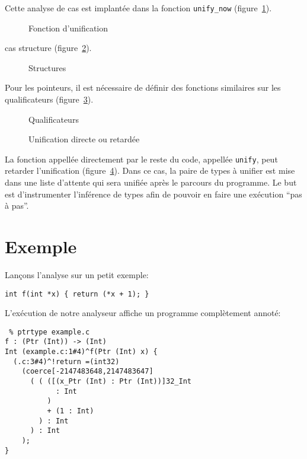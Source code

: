 Cette analyse de cas est implantée dans la fonction \texttt{unify_now}
(figure~\ref{fig:implem-unify-now}).

\begin{figure}
\caption{Fonction d'unification}
\label{fig:implem-unify-now}
\end{figure}

cas structure (figure~\ref{fig:implem-unify-structs}).

\begin{figure}
\caption{Structures}
\label{fig:implem-unify-structs}
\end{figure}

Pour les pointeurs, il est nécessaire de définir des fonctions similaires sur
les qualificateurs (figure~\ref{fig:implem-qualifs}).

\begin{figure}


  \caption{Qualificateurs}
\label{fig:implem-qualifs}

\end{figure}

\begin{figure}


\caption{Unification directe ou retardée}
\label{fig:implem-lazy}
\end{figure}

La fonction appellée directement par le reste du code, appellée \texttt{unify},
peut retarder l'unification (figure~\ref{fig:implem-lazy}). Dans ce cas, la
paire de types à unifier est mise dans une liste d'attente qui sera unifiée
après le parcours du programme. Le but est d'instrumenter l'inférence de types
afin de pouvoir en faire une exécution ``pas à pas''.

\section{Exemple}

Lançons l'analyse sur un petit exemple:

\begin{verbatim}
int f(int *x) { return (*x + 1); }
\end{verbatim}

L'exécution de notre analyseur affiche un programme complètement annoté:

\begin{verbatim}
 % ptrtype example.c
f : (Ptr (Int)) -> (Int)
Int (example.c:1#4)^f(Ptr (Int) x) {
  (.c:3#4)^!return =(int32)
    (coerce[-2147483648,2147483647]
      ( ( ([(x_Ptr (Int) : Ptr (Int))]32_Int
            : Int
          )
          + (1 : Int)
        ) : Int
      ) : Int
    );
}
\end{verbatim}

